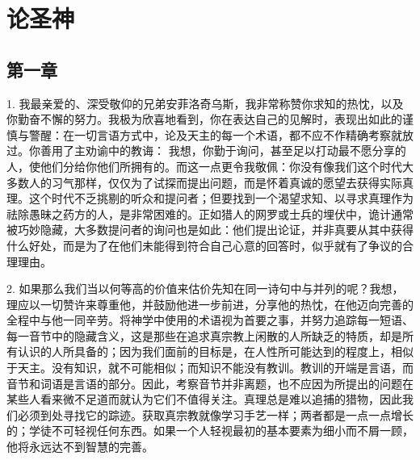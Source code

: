 
\chapter{论圣神}



\section{第一章}

\par

1. 我最亲爱的、深受敬仰的兄弟安菲洛奇乌斯，我非常称赞你求知的热忱，以及你勤奋不懈的努力。我极为欣喜地看到，你在表达自己的见解时，表现出如此的谨慎与警醒：在一切言语方式中，论及天主的每一个术语，都不应不作精确考察就放过。你善用了主劝谕中的教诲： 我想，你勤于询问，甚至足以打动最不愿分享的人，使他们分给你他们所拥有的。而这一点更令我敬佩：你没有像我们这个时代大多数人的习气那样，仅仅为了试探而提出问题，而是怀着真诚的愿望去获得实际真理。这个时代不乏挑剔的听众和提问者；但要找到一个渴望求知、以寻求真理作为祛除愚昧之药方的人，是非常困难的。正如猎人的网罗或士兵的埋伏中，诡计通常被巧妙隐藏，大多数提问者的询问也是如此：他们提出论证，并非真要从其中获得什么好处，而是为了在他们未能得到符合自己心意的回答时，似乎就有了争议的合理理由。\par

2. 如果那么我们当以何等高的价值来估价先知在同一诗句中与并列的呢？我想，理应以一切赞许来尊重他，并鼓励他进一步前进，分享他的热忱，在他迈向完善的全程中与他一同辛劳。将神学中使用的术语视为首要之事，并努力追踪每一短语、每一音节中的隐藏含义，这是那些在追求真宗教上闲散的人所缺乏的特质，却是所有认识的人所具备的；因为我们面前的目标是，在人性所可能达到的程度上，相似于天主。没有知识，就不可能相似；而知识不能没有教训。教训的开端是言语，而音节和词语是言语的部分。因此，考察音节并非离题，也不应因为所提出的问题在某些人看来微不足道而就认为它们不值得关注。真理总是难以追捕的猎物，因此我们必须到处寻找它的踪迹。获取真宗教就像学习手艺一样；两者都是一点一点增长的；学徒不可轻视任何东西。如果一个人轻视最初的基本要素为细小而不屑一顾，他将永远达不到智慧的完善。\par

